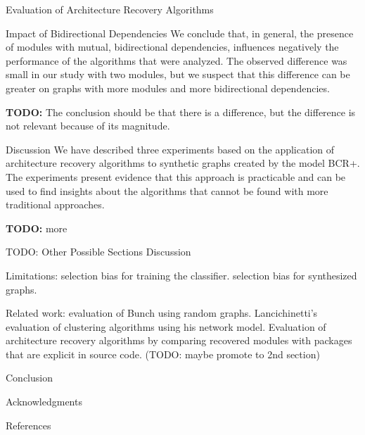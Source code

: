 \documentclass[11pt,twocolumn,a4paper,english]{article}
\newcommand{\TODO}{\textbf{TODO:} }
\begin{document}
\begin{section}{Evaluation of Architecture Recovery Algorithms}
\begin{subsection}{Impact of Bidirectional Dependencies}
	We conclude that, in general, the presence of modules with mutual, bidirectional dependencies, influences negatively the performance of the algorithms that were analyzed. The observed difference was small in our study with two modules, but we suspect that this difference can be greater on graphs with more modules and more bidirectional dependencies.

	\TODO The conclusion should be that there is a difference, but the difference is not relevant because of its magnitude.
	
\end{subsection}

\begin{subsection}{Discussion}
	We have described three experiments based on the application of architecture recovery algorithms to synthetic graphs created by the model BCR+. The experiments present evidence that this approach is practicable and can be used to find insights about the algorithms that cannot be found with more traditional approaches.
	
	\TODO more
	
\end{subsection}

\end{section}


\begin{section}{TODO: Other Possible Sections}
	Discussion
	
	Limitations: selection bias for training the classifier. selection bias for synthesized graphs.
	
	Related work: evaluation of Bunch using random graphs. Lancichinetti's evaluation of clustering algorithms using his network model. Evaluation of architecture recovery algorithms by comparing recovered modules with packages that are explicit in source code. (TODO: maybe promote to 2nd section)
	
	Conclusion
	
	Acknowledgments
	
	References	
\end{section}




\end{document}
